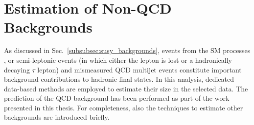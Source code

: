 \section{Estimation of Non-QCD Backgrounds}
\label{sec:RA2_Non-QCD}
As discussed in Sec.~\ref{subsubsec:susy_backgrounds}, events from the SM processes \ZInvJets, \WJets or semi-leptonic \ttbar events (in which either the lepton is lost or a hadronically decaying $\tau$ lepton) and mismeasured QCD multijet events constitute important background contributions to hadronic final states. In this analysis, dedicated data-based methods are employed to estimate their size in the selected data. 
The prediction of the QCD background has been performed as part of the work presented in this thesis. For completeness, also the techniques to estimate other backgrounds are introduced briefly.

